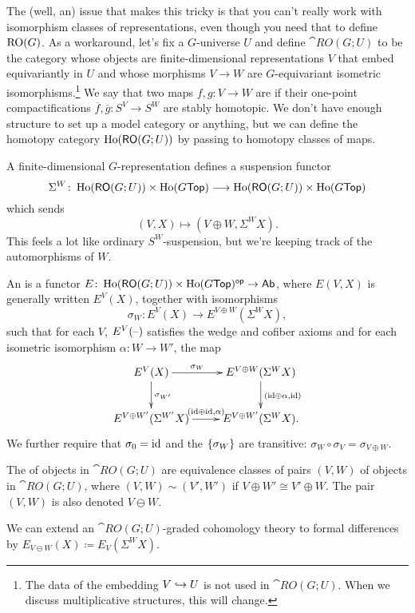 The (well, an) issue that makes this tricky is that you can't really work with isomorphism classes of
representations, even though you need that to define $\mathrm{RO}(G)$. As a workaround, let's fix a
$G$-universe $U$ and define $\cat{RO}(G;U)$ to be the category whose objects are finite-dimensional
representations $V$ that embed equivariantly in $U$ and whose morphisms $V\to W$ are $G$-equivariant isometric
isomorphisms.\footnote{The data of the embedding $V\hookrightarrow U$ is not used in $\cat{RO}(G;U)$. When we discuss
multiplicative structures, this will change.} We say that two maps $f,g\colon V\to W$ are  if their
one-point compactifications $\overline f, \overline g\colon S^V\to S^W$ are stably homotopic. We don't have enough
structure to set up a model category or anything, but we can define the homotopy category $\operatorname{Ho}(\mathsf{RO}(G;U))$ by
passing to homotopy classes of maps.

A finite-dimensional $G$-representation defines a suspension functor
\[\Sigma^W\colon \operatorname{Ho}(\mathsf{RO}(G;U))\times\operatorname{Ho}(G\mathsf{Top})\longrightarrow \operatorname{Ho}(\mathsf{RO}(G;U))\times\operatorname{Ho}(G\mathsf{Top})\]
which sends
\[(V,X)\mapsto (V\oplus W, \Sigma^W X).\]
This feels a lot like ordinary $S^W$-suspension, but we're keeping track of the automorphisms of $W$.
\begin{defn}
An  is a
functor $E\colon\operatorname{Ho}(\mathsf{RO}(G;U))\times\operatorname{Ho}(G\mathsf{Top})^{\mathsf{op}}\to\mathsf{Ab}$, where $E(V,X)$ is generally written $E^V(X)$,
together with isomorphisms
\[\sigma_W\colon E^V(X)\longrightarrow E^{V\oplus W}(\Sigma^W X),\]
such that for each $V$, $E^V(\text{--})$ satisfies the wedge and cofiber axioms and for each isometric isomorphism
$\alpha\colon W\to W'$, the map
\[\xymatrix{
	E^V(X)\ar[r]^-{\sigma_W}\ar[d]^{\sigma_{W'}} & E^{V\oplus W}(\Sigma^W X)\ar[d]^{(\id\oplus\alpha, \id)}\\
	E^{V\oplus W'}(\Sigma^{W'}X)\ar[r]^{(\id\oplus\id, \alpha)} & E^{V\oplus W'}(\Sigma^W X).
}\]
We further require that $\sigma_0 = \mathrm{id}$ and the $\{\sigma_W\}$ are transitive: $\sigma_W\circ\sigma_V =
\sigma_{V\oplus W}$.
\end{defn}
\begin{defn}
The  of objects in $\cat{RO}(G;U)$ are equivalence classes of pairs $(V,W)$ of objects in
$\cat{RO}(G;U)$, where $(V,W)\sim(V',W')$ if $V\oplus W'\cong V'\oplus W$. The pair $(V,W)$ is also denoted
$V\ominus W$.
\end{defn}
We can extend an $\cat{RO}(G;U)$-graded cohomology theory to formal differences by $E_{V\ominus W}(X)\coloneqq
E_V(\Sigma^W X)$.

